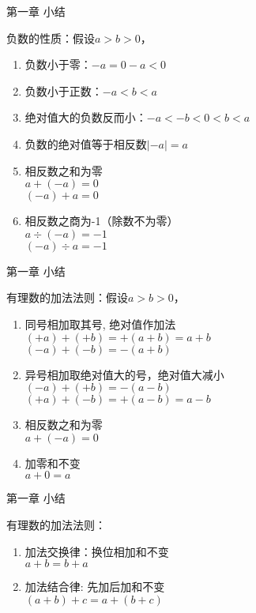 \documentclass[aspectratio=169]{ctexbeamer} %
\date{\today}
\begin{document}
\begin{frame}[t]{第一章 小结}
\begin{spacing}{1.2}
\normalsize
负数的性质：假设$a > b > 0$，
\begin{enumerate}[label={\arabic*.}]
\item 负数小于零：$-a = 0 - a < 0$
\item 负数小于正数：$-a < b < a$
\item 绝对值大的负数反而小：$-a < -b < 0 < b < a$
\item 负数的绝对值等于相反数$ |-a| = a$
\item 相反数之和为零\\
$a + (-a) = 0$ \\
$(-a) + a = 0$ 
\item 相反数之商为-1（除数不为零） \\
$ a ÷ (-a) = -1$ \\
$ (-a) ÷ a = -1$ 
\end{enumerate}
\end{spacing}
\end{frame}

\begin{frame}[t]{第一章 小结}
\begin{spacing}{1.2}
\normalsize
有理数的加法法则：假设$a > b > 0$，
\begin{enumerate}[label={\arabic*.}]
\item 同号相加取其号, 绝对值作加法\\
$(+a) + (+b) = +(a+b) = a + b$ \\
$(-a) + (-b) = -(a+b)$ 
\item 异号相加取绝对值大的号，绝对值大减小 \\
$(-a) + (+b) = -(a-b)$ \\
$(+a) + (-b) = +(a-b) = a - b$ 
\item 相反数之和为零 \\
 $a + (-a) = 0$ 
\item 加零和不变 \\
$a + 0 = a $
\end{enumerate}
\end{spacing}
\end{frame}

\begin{frame}[t]{第一章 小结}
\begin{spacing}{1.5} %
\Large
有理数的加法法则：
\begin{enumerate}[label={\arabic*.}]
\item 加法交换律：换位相加和不变 \\
$a + b = b + a$
\item 加法结合律: 先加后加和不变 \\
$(a + b) + c = a + (b + c)$
\end{enumerate}
\end{spacing}
\end{frame}
\end{document}

